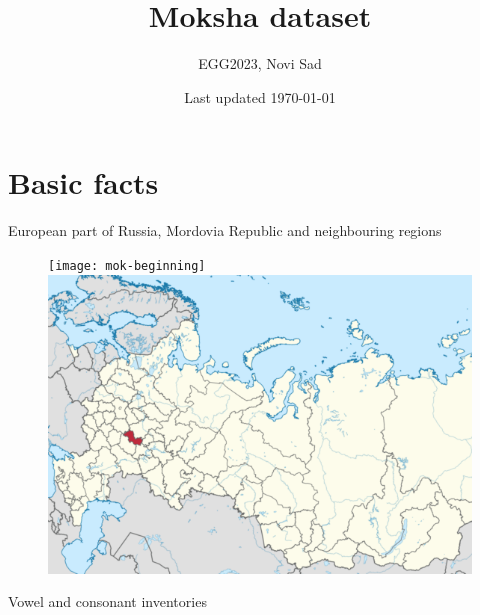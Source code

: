 \documentclass[a4paper, 12pt]{article}
\title{Moksha dataset}
\author{EGG2023, Novi Sad}
\date{Last updated \today}
\begin{document}
\maketitle

	\section{Basic facts}
	
	European part of Russia, Mordovia Republic and neighbouring regions
	
	\begin{figure}[H]
		\centering
		\texttt{[image: mok-beginning]}
		\hfill
		\includegraphics[scale=.373]{mok-map}
	\end{figure}
	
	\noindent Vowel and consonant inventories \parencite{kukhto2018}
	
\end{document}
